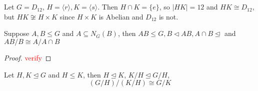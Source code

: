 
\chapter{}

\begin{example}
  Let $G = D_{12}$, $H = \langle r \rangle , K = \langle  s \rangle $. Then $H \cap K = \{ e \}$, so $|HK| = 12$ and $HK \cong D_{12}$, but $HK \not \cong H \times K$ since $H \times K$ is Abelian and $ D_{12} $ is not.
\end{example}

\begin{theorem}
  Suppose $A, B \leqslant G$ and $A \subseteq N_G(B)$, then $AB \leqslant G, B \triangleleft AB, A\cap B \trianglelefteq $ and  $AB/B \cong A/A\cap B$

  \begin{center}
  \end{center}
\end{theorem}
\begin{proof}
   \textcolor{red}{verify}
\end{proof}

\begin{theorem}[]
  Let $H , K \trianglelefteq G$ and $H \leqslant K$, then $H \trianglelefteq K$, $K/H \trianglelefteq G/H$, \[
    (G/H)/(K/H) \cong G/K
  \]
\end{theorem}
